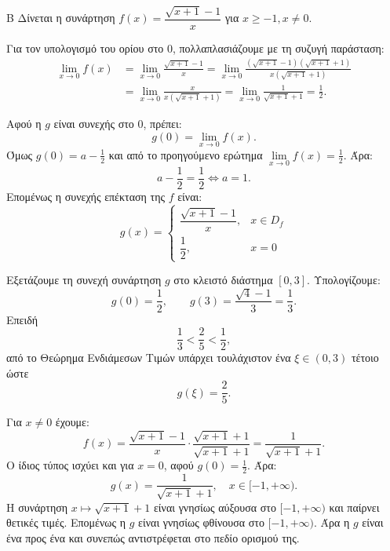 \begin{thema}{Β}
Δίνεται η συνάρτηση $f(x) = \dfrac{\sqrt{x+1}-1}{x}$ για $x \ge -1, x \ne 0$.
\begin{erwthma}
\item Για τον υπολογισμό του ορίου στο 0, πολλαπλασιάζουμε με τη συζυγή παράσταση:
\begin{align*}
\lim_{x\to0} f(x)
&= \lim_{x\to0} \frac{\sqrt{x+1}-1}{x}
= \lim_{x\to0} \frac{(\sqrt{x+1}-1)(\sqrt{x+1}+1)}{x(\sqrt{x+1}+1)}\\
&= \lim_{x\to0} \frac{x}{x(\sqrt{x+1}+1)}
= \lim_{x\to0} \frac{1}{\sqrt{x+1}+1}
= \frac{1}{2}.
\end{align*}

\item Αφού η $g$ είναι συνεχής στο $0$, πρέπει:
\[ g(0)=\lim_{x\to0} f(x). \]
Όμως $g(0)=a-\frac{1}{2}$ και από το προηγούμενο ερώτημα $\lim\limits_{x\to0} f(x)=\frac{1}{2}$. Άρα:
\[ a-\frac{1}{2}=\frac{1}{2}\Leftrightarrow a=1. \]
Επομένως η συνεχής επέκταση της $f$ είναι:
\[ g(x)=\begin{cases}
\dfrac{\sqrt{x+1}-1}{x}, & x\in D_f\\[4pt]
\dfrac{1}{2}, & x=0
\end{cases} \]

\item Εξετάζουμε τη συνεχή συνάρτηση $g$ στο κλειστό διάστημα $[0, 3]$.
Υπολογίζουμε:
\[ g(0)=\frac{1}{2}, \qquad g(3)=\frac{\sqrt{4}-1}{3}=\frac{1}{3}. \]
Επειδή
\[ \frac{1}{3}<\frac{2}{5}<\frac{1}{2}, \]
από το Θεώρημα Ενδιάμεσων Τιμών υπάρχει τουλάχιστον ένα $\xi\in(0,3)$ τέτοιο ώστε
\[ g(\xi)=\frac{2}{5}. \]

\item Για $x\ne0$ έχουμε:
\[ f(x)=\frac{\sqrt{x+1}-1}{x}\cdot\frac{\sqrt{x+1}+1}{\sqrt{x+1}+1}
=\frac{1}{\sqrt{x+1}+1}. \]
Ο ίδιος τύπος ισχύει και για $x=0$, αφού $g(0)=\frac{1}{2}$. Άρα:
\[ g(x)=\frac{1}{\sqrt{x+1}+1}, \quad x\in[-1,+\infty). \]
Η συνάρτηση $x\mapsto \sqrt{x+1}+1$ είναι γνησίως αύξουσα στο $[-1,+\infty)$ και παίρνει θετικές τιμές. Επομένως η $g$ είναι γνησίως φθίνουσα στο $[-1,+\infty)$.
Άρα η $g$ είναι ένα προς ένα και συνεπώς αντιστρέφεται στο πεδίο ορισμού της.
\end{erwthma}
\end{thema}

